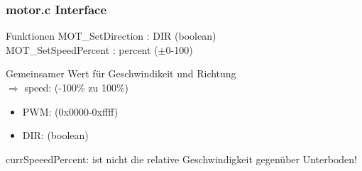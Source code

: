\documentclass{beamer}
\begin{document}
\begin{frame}
		\frametitle{motor.c Interface}
		
		\begin{block}{Funktionen}
			MOT\_SetDirection : DIR (boolean)\\
			MOT\_SetSpeedPercent : percent ($\pm$0-100) %
		\end{block}

		\begin{block}{}
			Gemeinsamer Wert für Geschwindikeit und Richtung\\ $\Rightarrow$ speed: (-100\% zu 100\%)
			\begin{itemize}
				\item{PWM: (0x0000-0xffff)}
				\item{DIR: (boolean)}
			\end{itemize}
		\end{block}

		\begin{alertblock}{}
			currSpeeedPercent: ist nicht die relative Geschwindigkeit gegenüber Unterboden!
		\end{alertblock}
\end{frame}
\end{document}
